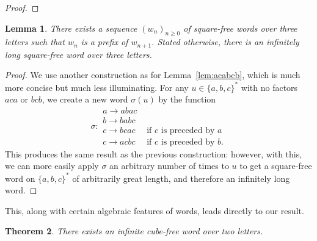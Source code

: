 \documentclass[letterpaper,12pt]{article}
\newtheorem{thm}{Theorem}
\newtheorem{lem}[thm]{Lemma}
\begin{document}
\begin{proof}
\end{proof}

\begin{lem} There exists a sequence $(w_n)_{n \geq 0}$ of square-free words 
over three letters such that $w_n$ is a prefix of $w_{n+1}$. Stated otherwise, there is an infinitely long square-free word over three letters.\end{lem}

\begin{proof}

We use another construction as for Lemma~\ref{lem:acabcb}, which is much more concise but much less illuminating. For any $u \in \{a, b, c\}^*$ with no factors $aca$ or $bcb$, we create a new word $\sigma(u)$ by the function
\[
	\sigma :
	\begin{array}{ll}
		a \rightarrow abac & \\
		b \rightarrow babc & \\
		c \rightarrow bcac & \text{ if $c$ is preceded by $a$} \\
		c \rightarrow acbc & \text{ if $c$ is preceded by $b$}.
	\end{array}
\]
This produces the same result as the previous construction: however, with this, we can more easily apply $\sigma$ an arbitrary number of times to $u$ to get a square-free word on $\{a, b, c\}^*$ of arbitrarily great length, and therefore an infinitely long word.

\end{proof}

This, along with certain algebraic features of words, leads directly to our result.

\begin{thm}
There exists an infinite cube-free word over two letters.
\end{thm}
\end{document}
